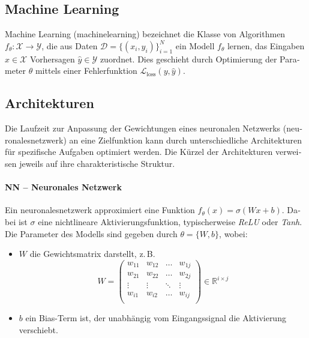 \begin{otherlanguage}{ngerman}
\section{Machine Learning}

Machine Learning (\gls{machinelearning}) bezeichnet die Klasse von Algorithmen \( f_{\theta} : \mathcal{X} \rightarrow \mathcal{Y} \), die aus Daten 
\( \mathcal{D} = \{ (x_i, y_i) \}_{i=1}^{N} \) ein Modell \( f_{\theta} \) lernen, das Eingaben \( x \in \mathcal{X} \) Vorhersagen \( \hat{y} \in \mathcal{Y} \) zuordnet. Dies geschieht durch Optimierung der Parameter \( \theta \) mittels einer Fehlerfunktion \( \mathcal{L}_{\text{loss}}(y, \hat{y}) \).

\subsection{Architekturen}

Die Laufzeit zur Anpassung der Gewichtungen eines neuronalen Netzwerks (\gls{neuronalesnetzwerk}) an eine Zielfunktion kann durch unterschiedliche Architekturen für spezifische Aufgaben optimiert werden. Die Kürzel der Architekturen verweisen jeweils auf ihre charakteristische Struktur.

\paragraph{NN – Neuronales Netzwerk}
Ein \gls{neuronalesnetzwerk} approximiert eine Funktion \( f_{\theta}(x) = \sigma(Wx + b) \). Dabei ist \( \sigma \) eine nichtlineare Aktivierungsfunktion, typischerweise \textit{ReLU} oder \textit{Tanh}. Die Parameter des Modells sind gegeben durch \( \theta = \{ W, b \} \), wobei:

\begin{itemize}
  \item \( W \) die Gewichtsmatrix darstellt, z.\,B. 
    \[
      W = 
      \begin{pmatrix}
        w_{11} & w_{12} & \dots  & w_{1j} \\
        w_{21} & w_{22} & \dots  & w_{2j} \\
        \vdots & \vdots & \ddots & \vdots \\
        w_{i1} & w_{i2} & \dots  & w_{ij} \\
      \end{pmatrix}
      \in \mathbb{R}^{i \times j}
    \]
  \item \( b \) ein Bias-Term ist, der unabhängig vom Eingangssignal die Aktivierung verschiebt.
\end{itemize}


\end{otherlanguage}
